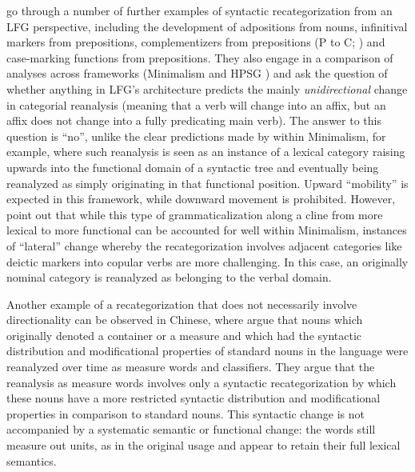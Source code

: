 \documentclass[output=paper,hidelinks]{langscibook}
\begin{document}
\citet{vincent2020heads} go through a number of further examples of syntactic recategorization from an LFG perspective, including the development of adpositions from nouns, infinitival markers from prepositions,  complementizers from prepositions (P to C;  \citealt{vincent1999evolution}) and case-marking functions from prepositions. They also engage in a comparison of analyses across frameworks (Minimalism \citep{chomsky1995the-minimalist} and HPSG \citep{pollard1994head-driven}) and ask the question of whether anything in LFG's architecture predicts the mainly \textit{unidirectional} change in categorial reanalysis (meaning that a verb will change into an affix, but an affix does not change into a fully predicating main verb). The answer to this question is ``no'', unlike the clear predictions made by \citet{robertsroussou03} within Minimalism, for example, where such reanalysis is seen as an instance of a lexical category raising upwards into the functional domain of a syntactic tree and eventually being reanalyzed as simply originating in that functional position. Upward ``mobility'' is expected in this framework, while downward movement is prohibited. However, \citet{vincent2020heads} point out that while this type of grammaticalization along a cline from more lexical to more functional can be accounted for well within Minimalism, instances of ``lateral'' change whereby the recategorization involves adjacent categories like deictic markers  into copular verbs \citep{borjars2017lexical} are more challenging. In this case, an originally nominal category is reanalyzed as belonging to the verbal domain. 

Another example of a recategorization that does not necessarily involve directionality can be observed in Chinese, where \citet{BorjarsPayne21} argue that  nouns which originally denoted a container or a measure and which had the syntactic distribution and modificational properties of standard nouns in the language were reanalyzed over time as measure words and classifiers. They argue that the reanalysis as measure words involves only a syntactic recategorization by which these nouns have a more restricted syntactic distribution and modificational properties in comparison to standard nouns. This syntactic change is not accompanied by a systematic semantic or functional change: the words still measure out units, as in the original usage and appear to retain their full lexical semantics. 

\end{document}
